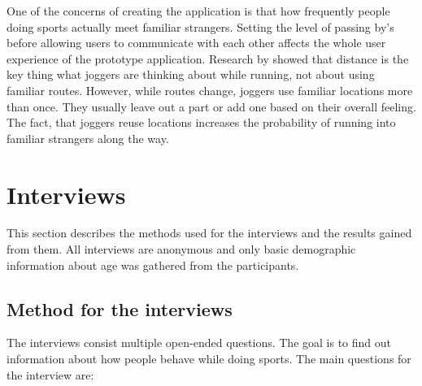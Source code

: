 One of the concerns of creating the application is that how frequently people doing sports actually meet familiar strangers. Setting the level of passing by's before allowing users to communicate with each other affects the whole user experience of the prototype application. Research by \cite{runningNavigation} showed that distance is the key thing what joggers are thinking about while running, not about using familiar routes. However, while routes change, joggers use familiar locations more than once. They usually leave out a part or add one based on their overall feeling. The fact, that joggers reuse locations increases the probability of running into familiar strangers along the way.

\section{Interviews}

This section describes the methods used for the interviews and the results gained from them. All interviews are anonymous and only basic demographic information about age was gathered from the participants.

\subsection{Method for the interviews}

The interviews consist multiple open-ended questions. The goal is to find out information about how people behave while doing sports. The main questions for the interview are:

